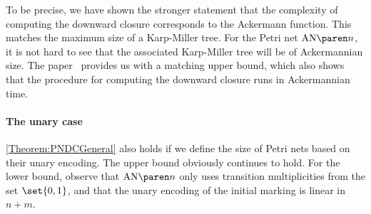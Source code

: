 \documentclass[../../diss.tex]{subfiles}
\begin{document}
To be precise, we have shown the stronger statement that the complexity of computing the downward closure corresponds to the Ackermann function.
This matches the maximum size of a Karp-Miller tree.
For the Petri net $\AckerNet{n}$, it is not hard to see that the associated Karp-Miller tree will be of Ackermannian size.
The paper~\cite{FigueiraFSS11} provides us with a matching upper bound, which also shows that the procedure for computing the downward closure runs in Ackermannian time.

\paragraph{The unary case}

\cref{Theorem:PNDCGeneral} also holds if we define the size of Petri nets based on their unary encoding.
The upper bound obviously continues to hold.
For the lower bound, observe that $\AckerNet{n}$ only uses transition multiplicities from the set $\set{0,1}$, and that the unary encoding of the initial marking is linear in $n + m$.
\end{document}

